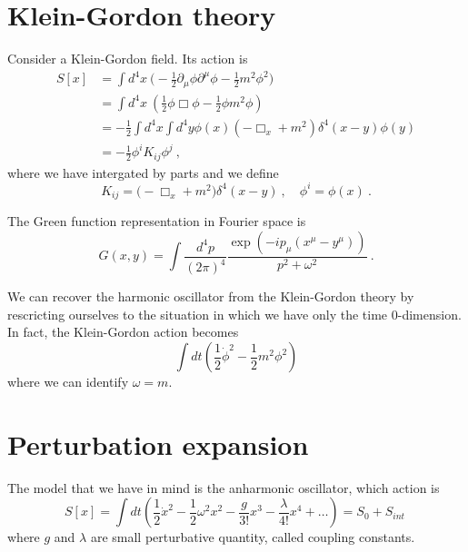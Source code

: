 \section{Klein-Gordon theory}

    Consider a Klein-Gordon field. Its action is 
    \begin{equation*}
    \begin{aligned}
        S[x] & = \int d^4 x ~ \Big ( - \frac{1}{2} \partial_\mu \phi \partial^\mu \phi - \frac{1}{2} m^2 \phi^2 \Big) \\ & = \int d^4 x ~ ( \frac{1}{2} \phi \Box \phi - \frac{1}{2} \phi m^2 \phi) \\ & = - \frac{1}{2} \int d^4 x \int d^4 y \phi(x) (- \Box_x + m^2) \delta^4 (x - y) \phi(y) \\ & = - \frac{1}{2} \phi^i K_{ij} \phi^j ~,
    \end{aligned}
    \end{equation*}
    where we have intergated by parts and we define 
    \begin{equation*}
        K_{ij} = \Big (- \Box_x + m^2 \Big) \delta^4 (x - y) ~, \quad \phi^i = \phi(x) ~.
    \end{equation*}

    The Green function representation in Fourier space is 
    \begin{equation*}
        G(x, y) = \int \frac{d^4p}{(2\pi)^4} \frac{\exp(- i p_\mu (x^\mu - y^\mu))}{p^2 + \omega^2} ~.
    \end{equation*} 

    We can recover the harmonic oscillator from the Klein-Gordon theory by rescricting ourselves to the situation in which we have only the time $0$-dimension. In fact, the Klein-Gordon action becomes 
    \begin{equation*}
        \int dt (\frac{1}{2} \dot \phi^2 - \frac{1}{2} m^2 \phi^2)
    \end{equation*}
    where we can identify $\omega = m$. 

\section{Perturbation expansion}

    The model that we have in mind is the anharmonic oscillator, which action is
    \begin{equation*}
        S[x] = \int dt (\frac{1}{2} \dot x^2 - \frac{1}{2} \omega^2 x^2 - \frac{g}{3!} x^3 - \frac{\lambda}{4!} x^4 + \ldots) = S_0 + S_{int} ~
    \end{equation*}
    where $g$ and $\lambda$ are small perturbative quantity, called coupling constants.


